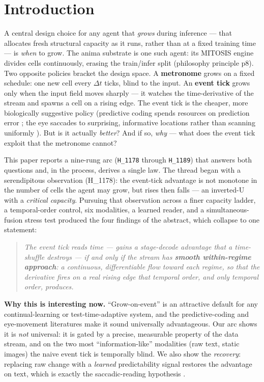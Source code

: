 \documentclass[11pt,a4paper]{article}
\begin{document}
\section{Introduction}
\label{sec:intro}

A central design choice for any agent that \emph{grows} during inference --- that
allocates fresh structural capacity as it runs, rather than at a fixed training
time --- is \emph{when} to grow. The anima substrate is one such agent: its
MITOSIS engine divides cells continuously, erasing the train/infer split
(philosophy principle p8). Two opposite policies bracket the design space. A
\textbf{metronome} grows on a fixed schedule: one new cell every $\Delta t$
ticks, blind to the input. An \textbf{event tick} grows only when the input field
moves sharply --- it watches the time-derivative of the stream and spawns a cell
on a rising edge. The event tick is the cheaper, more biologically suggestive
policy (predictive coding spends resources on prediction error
\citep{rao1999predictive,friston2009predictive,spratling2017review}; the eye
saccades to surprising, informative locations rather than scanning uniformly
\citep{rayner1998eye,itti2009bayesian}). But is it actually \emph{better}? And if
so, \emph{why} --- what does the event tick exploit that the metronome cannot?

This paper reports a nine-rung arc (\texttt{H\_1178} through \texttt{H\_1189})
that answers both questions and, in the process, derives a single law. The thread
began with a serendipitous observation (H\_1178): the event-tick advantage is not
monotone in the number of cells the agent may grow, but rises then falls --- an
inverted-U with a \emph{critical capacity}. Pursuing that observation across a
finer capacity ladder, a temporal-order control, six modalities, a learned reader,
and a simultaneous-fusion stress test produced the four findings of the abstract,
which collapse to one statement:

\begin{quote}\itshape
The event tick reads time --- gains a stage-decode advantage that a time-shuffle
destroys --- if and only if the stream has \textbf{smooth within-regime approach}:
a continuous, differentiable flow toward each regime, so that the derivative fires
on a real rising edge that temporal order, and only temporal order, produces.
\end{quote}

\medskip
\noindent\textbf{Why this is interesting now.} ``Grow-on-event'' is an attractive
default for any continual-learning or test-time-adaptive system, and the
predictive-coding and eye-movement literatures make it sound universally
advantageous. Our arc shows it is \emph{not} universal: it is gated by a precise,
measurable property of the data stream, and on the two most ``information-like''
modalities (raw text, static images) the naive event tick is temporally blind. We
also show the \emph{recovery}: replacing raw change with a \emph{learned}
predictability signal restores the advantage on text, which is exactly the
saccadic-reading hypothesis \citep{rayner2009eye,smith2013logarithmic}.
\end{document}
